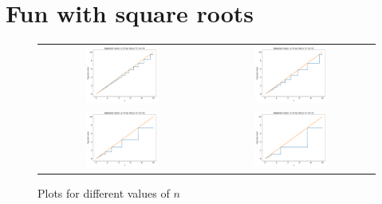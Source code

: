 \section{Fun with square roots}
\begin{figure}[H]
	\begin{center}
		\begin{tabular}{c c} %
			\includegraphics[width=0.45\textwidth]{./figures/plot_for_n_49} & \includegraphics[width=0.45\textwidth]{./figures/plot_for_n_50} \\
			\includegraphics[width=0.45\textwidth]{./figures/plot_for_n_51} & \includegraphics[width=0.45\textwidth]{./figures/plot_for_n_52}
		\end{tabular}
	\end{center}
	\caption[funwithsquareroots] 
	{ Plots for different values of $n$}
\end{figure}